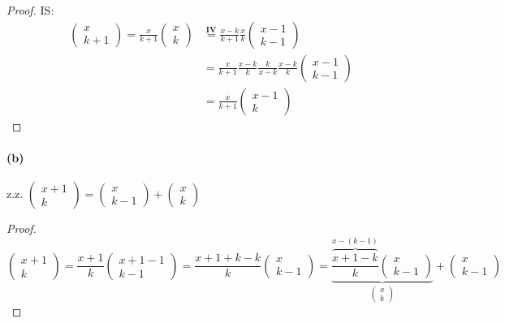 \begin{proof}
IS:
\begin{align*}
\begin{pmatrix}
x\\
k+1
\end{pmatrix}
=\frac{x}{k+1}
\begin{pmatrix}
x\\
k
\end{pmatrix}
&\overset{\mathbf{IV}}{=}
\frac{x-k}{k+1}\frac{x}{k}
\begin{pmatrix}
x-1\\
k-1
\end{pmatrix}\\
&=\frac{x}{k+1}\frac{x-k}{k}\frac{k}{x-k}\frac{x-k}{k}
\begin{pmatrix}
x-1\\
k-1
\end{pmatrix}\\
&=\frac{x}{k+1}
\begin{pmatrix}
x-1\\
k
\end{pmatrix}
\end{align*}
\end{proof}

\paragraph{(b)}
z.z. $
\begin{pmatrix}
x+1\\
k
\end{pmatrix}=
\begin{pmatrix}
x\\
k-1
\end{pmatrix}+
\begin{pmatrix}
x\\
k
\end{pmatrix}
$
\begin{proof}
\begin{equation*}
\begin{pmatrix}
x+1\\
k
\end{pmatrix}
=\frac{x+1}{k}
\begin{pmatrix}
x+1-1\\
k-1
\end{pmatrix}
=\frac{x+1+k-k}{k}
\begin{pmatrix}
x\\
k-1
\end{pmatrix}
=
\underset{
\begin{pmatrix}
x\\
k
\end{pmatrix}
}{\underbrace{
\frac{\overset{x-(k-1)}{\overbrace{x+1-k}}}{k}
\begin{pmatrix}
x\\
k-1
\end{pmatrix}
}}
+
\begin{pmatrix}
x\\
k-1
\end{pmatrix}
\end{equation*}
\end{proof}

